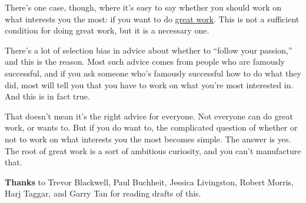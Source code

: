 There's one case, though, where it's easy to say whether you should work
on what interests you the most: if you want to do
\href{greatwork.html}{great work}. This is not a sufficient condition
for doing great work, but it is a necessary one.

There's a lot of selection bias in advice about whether to ``follow your
passion,'' and this is the reason. Most such advice comes from people
who are famously successful, and if you ask someone who's famously
successful how to do what they did, most will tell you that you have to
work on what you're most interested in. And this is in fact true.

That doesn't mean it's the right advice for everyone. Not everyone can
do great work, or wants to. But if you do want to, the complicated
question of whether or not to work on what interests you the most
becomes simple. The answer is yes. The root of great work is a sort of
ambitious curiosity, and you can't manufacture that.


\textbf{Thanks} to Trevor Blackwell, Paul Buchheit, Jessica Livingston,
Robert Morris, Harj Taggar, and Garry Tan for reading drafts of this.